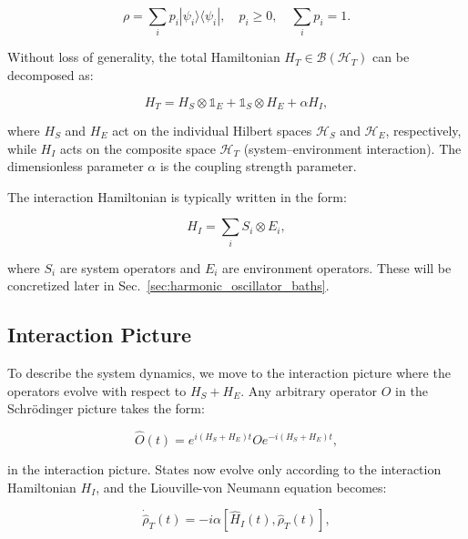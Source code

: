 \begin{equation}
	\rho = \sum_i p_i |\psi_i\rangle \langle \psi_i|, \quad p_i \geq 0, \quad \sum_i p_i = 1.
\end{equation}

\noindent
Without loss of generality, the total Hamiltonian $H_T \in \mathcal{B}(\mathcal{H}_T)$ can be decomposed as:

\begin{equation}
	H_T = H_S \otimes \mathds{1}_E + \mathds{1}_S \otimes H_E + \alpha H_I,
	\label{eq:Total_Hamiltonian}
\end{equation}

\noindent
where $H_S$ and $H_E$ act on the individual Hilbert spaces $\mathcal{H}_S$ and $\mathcal{H}_E$, respectively, while $H_I$ acts on the composite space $\mathcal{H}_T$ (system--environment interaction). The dimensionless parameter $\alpha$ is the coupling strength parameter.

\noindent The interaction Hamiltonian is typically written in the form:

\begin{equation}
	H_I = \sum_i S_i \otimes E_i,
	\label{eq:Interaction_Hamiltonian}
\end{equation}

\noindent
where $S_i$ are system operators and $E_i$ are environment operators. These will be concretized later in Sec.~\ref{sec:harmonic_oscillator_baths}.

\subsection{Interaction Picture}

\noindent
To describe the system dynamics, we move to the interaction picture where the operators evolve with respect to $H_S + H_E$. Any arbitrary operator $O$ in the Schrödinger picture takes the form:

\begin{equation}
	\hat{O}(t) = e^{i(H_S+H_E)t} O e^{-i(H_S+H_E)t},
	\label{eq:Interaction_Picture_Operators}
\end{equation}

\noindent
in the interaction picture. States now evolve only according to the interaction Hamiltonian $H_I$, and the Liouville-von Neumann equation becomes:

\begin{equation}
	\dot{\hat{\rho}}_T(t) = -i \alpha [\hat{H}_I(t), \hat{\rho}_T(t)],
	\label{eq:LiouvilleVN}
\end{equation}

